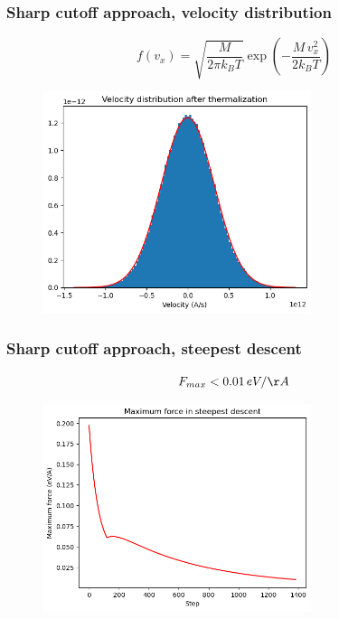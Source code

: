 \documentclass{beamer}
\begin{document}
\begin{frame}
    \frametitle{Sharp cutoff approach, velocity distribution}

    $$f(v_x)=\sqrt{\frac{M}{{2\pi k_B T}}} \exp {\left(-\frac{M\, v_x^2}{2 k_B T}\right)}$$

    \begin{figure}
        \includegraphics[width=0.7\textwidth]{images/distvelocity1.png}
    \end{figure}

\end{frame}


\begin{frame}
    \frametitle{Sharp cutoff approach, steepest descent}

    $$F_{max}<0.01\,eV/\AA$$

    \begin{figure}
        \includegraphics[width=0.7\textwidth]{images/force.png}
    \end{figure}

\end{frame}
\end{document}
